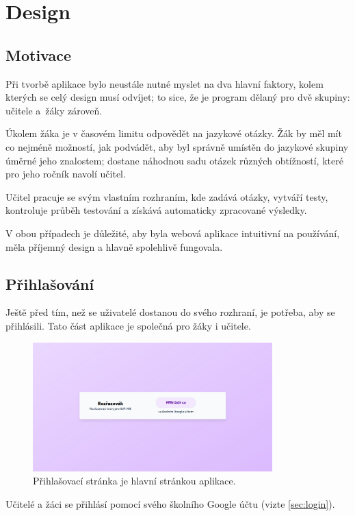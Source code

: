 \hypertarget{Design}{\chapter{Design}}

\section{Motivace}

Při tvorbě aplikace bylo neustále nutné myslet na dva hlavní faktory, kolem kterých se celý design musí odvíjet; to sice, že je program dělaný pro dvě skupiny: učitele a~žáky zároveň. 

Úkolem žáka je v časovém limitu odpovědět na jazykové otázky. Žák by měl mít co nejméně možností, jak podvádět, aby byl správně umístěn do jazykové skupiny úměrné jeho znalostem; dostane náhodnou sadu otázek různých obtížností, které pro jeho ročník navolí učitel.

Učitel pracuje se svým vlastním rozhraním, kde zadává otázky, vytváří testy, kontroluje průběh testování a získává automaticky zpracované výsledky.

V obou případech je důležité, aby byla webová aplikace intuitivní na používání, měla příjemný design a hlavně spolehlivě fungovala.

\section{Přihlašování}
\label{sec:login-design}

Ještě před tím, než se uživatelé dostanou do svého rozhraní, je potřeba, aby se přihlásili. Tato část aplikace je společná pro žáky i učitele. 

\begin{figure}[H]
    \centering
    \includegraphics[width=350px]{images/01design/login.png}
    \caption{Přihlašovací stránka je hlavní stránkou aplikace.}
\end{figure}

Učitelé a žáci se přihlásí pomocí svého školního Google účtu (vizte \ref{sec:login}).

